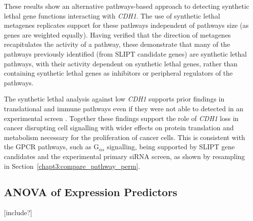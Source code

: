 These results show an alternative \glspl{pathway}-based approach to detecting \gls{synthetic lethal} gene functions interacting with \textit{CDH1}. The use of \gls{synthetic lethal} \glspl{metagene} replicates support for these \glspl{pathway} independent of \glspl{pathway} size (as genes are weighted equally). Having verified that the direction of \glspl{metagene} recapitulates the activity of a \gls{pathway}, these demonstrate that many of the \glspl{pathway} previously identified (from \gls{SLIPT} candidate genes) are \gls{synthetic lethal} \glspl{pathway}, with their activity dependent on \gls{synthetic lethal} genes, rather than containing \gls{synthetic lethal} genes as inhibitors or peripheral regulators of the \glspl{pathway}.


The \gls{synthetic lethal} analysis against low \textit{CDH1}  supports prior findings in translational and immune \glspl{pathway} even if they were not able to detected in an experimental screen \citep{Telford2015}. Together these findings support the role of \textit{CDH1} loss in cancer disrupting cell signalling with wider effects on protein translation and metabolism necessary for the proliferation of cancer cells. This is consistent with the \gls{GPCR} \glspl{pathway}, such as G$_{\alpha s}$ signalling, being supported by \gls{SLIPT} gene candidates and the experimental primary \gls{siRNA} screen, as shown by resampling in Section~\ref{chapt3:compare_pathway_perm}.


\FloatBarrier



\iffalse
\subsection{ANOVA of Expression Predictors}
[include?]

